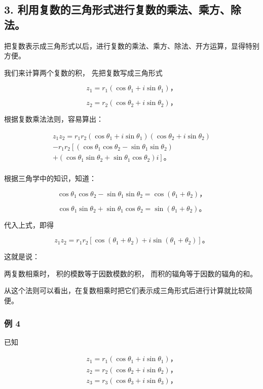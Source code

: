 \subsection{3. 利用复数的三角形式进行复数的乘法、乘方、除法。}

把复数表示成三角形式以后，进行复数的乘法、乘方、除法、开方运算，显得特别方便。

我们来计算两个复数的积， 先把复数写成三角形式

\[
z _ {1} = r _ {1} (\cos \theta_ {1} + i \sin \theta_ {1})\text{，}
\]

\[
z _ {2} = r _ {2} (\cos \theta_ {2} + i \sin \theta_ {2})\text{，}
\]

根据复数乘法法则，容易算出：

\[
\begin{array}{l} z _ {1} z _ {2} = r _ {1} r _ {2} (\cos \theta_ {1} + i \sin \theta_ {1}) (\cos \theta_ {2} + i \sin \theta_ {2}) \\ - r _ {1} r _ {2} \left[ (\cos \theta_ {1} \cos \theta_ {2} - \sin \theta_ {1} \sin \theta_ {2}) \right. \\ \left. + (\cos \theta_ {1} \sin \theta_ {2} + \sin \theta_ {1} \cos \theta_ {2}) i \right]\text{。} \\ \end{array}
\]

根据三角学中的知识，知道：

\[
\cos \theta_ {1} \cos \theta_ {2} - \sin \theta_ {1} \sin \theta_ {2} = \cos (\theta_ {1} + \theta_ {2})\text{，}
\]

\[
\cos \theta_ {1} \sin \theta_ {2} + \sin \theta_ {1} \cos \theta_ {2} = \sin (\theta_ {1} + \theta_ {2})\text{。}
\]

代入上式，即得

\[
z_1z_2=r_1r_2[\cos(\theta_1+\theta_2)+i\sin(\theta_1+\theta_2)]\text{。}
\]

这就是说：

两复数相乘时， 积的模数等于因数模数的积， 而积的辐角等于因数的辐角的和。

从这个法则可以看出，在复数相乘时把它们表示成三角形式后进行计算就比较简便。

\subsubsection{例 4}

已知

\[
\begin{array}{l} z _ {1} = r _ {1} (\cos \theta_ {1} + i \sin \theta_ {1})\text{，} \\ z _ {2} = r _ {2} (\cos \theta_ {2} + i \sin \theta_ {2})\text{，} \\ z _ {3} = r _ {3} (\cos \theta_ {3} + i \sin \theta_ {3})\text{，} \\ \end{array}
\]


